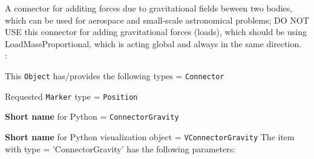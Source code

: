\ei

%
\newpage


\label{sec:item:ObjectConnectorGravity}
A connector for additing forces due to gravitational fields beween two bodies, which can be used for aerospace and small-scale astronomical problems; DO NOT USE this connector for adding gravitational forces (loads), which should be using LoadMassProportional, which is acting global and always in the same direction.
\vspace{12pt}\\

\noindent {}:
\bi
  \item This \texttt{Object} has/provides the following types = \texttt{Connector}
  \item Requested \texttt{Marker} type = \texttt{Position}
  \item {\bf Short name} for Python = \texttt{ConnectorGravity}
  \item {\bf Short name} for Python visualization object = \texttt{VConnectorGravity}
\ei\vspace{12pt} \noindent 
The item  with type = 'ConnectorGravity' has the following parameters:
\vspace{-0.5cm}\\
\vspace{-0.5cm}\\
